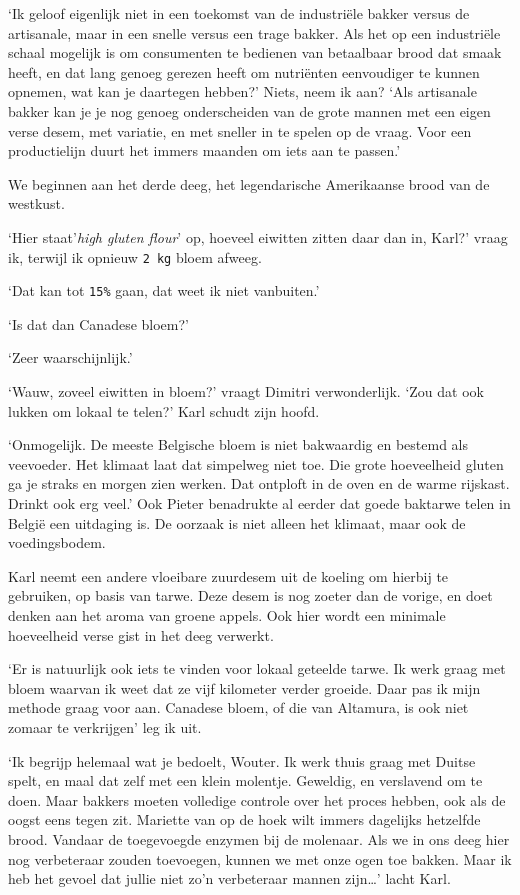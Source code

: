 \documentclass[
  11pt,
  dutch,
]{memoir}
\begin{document}
`Ik geloof eigenlijk niet in een toekomst van de industriële bakker
versus de artisanale, maar in een snelle versus een trage bakker. Als
het op een industriële schaal mogelijk is om consumenten te bedienen van
betaalbaar brood dat smaak heeft, en dat lang genoeg gerezen heeft om
nutriënten eenvoudiger te kunnen opnemen, wat kan je daartegen hebben?'
Niets, neem ik aan? `Als artisanale bakker kan je je nog genoeg
onderscheiden van de grote mannen met een eigen verse desem, met
variatie, en met sneller in te spelen op de vraag. Voor een
productielijn duurt het immers maanden om iets aan te passen.'

We beginnen aan het derde deeg, het legendarische Amerikaanse brood van
de westkust.

`Hier staat'\emph{high gluten flour}' op, hoeveel eiwitten zitten daar
dan in, Karl?' vraag ik, terwijl ik opnieuw \texttt{2\ kg} bloem afweeg.

`Dat kan tot \texttt{15\%} gaan, dat weet ik niet vanbuiten.'

`Is dat dan Canadese bloem?'

`Zeer waarschijnlijk.'

`Wauw, zoveel eiwitten in bloem?' vraagt Dimitri verwonderlijk. `Zou dat
ook lukken om lokaal te telen?' Karl schudt zijn hoofd.

`Onmogelijk. De meeste Belgische bloem is niet bakwaardig en bestemd als
veevoeder. Het klimaat laat dat simpelweg niet toe. Die grote
hoeveelheid gluten ga je straks en morgen zien werken. Dat ontploft in
de oven en de warme rijskast. Drinkt ook erg veel.' Ook Pieter
benadrukte al eerder dat goede baktarwe telen in België een uitdaging
is. De oorzaak is niet alleen het klimaat, maar ook de voedingsbodem.

Karl neemt een andere vloeibare zuurdesem uit de koeling om hierbij te
gebruiken, op basis van tarwe. Deze desem is nog zoeter dan de vorige,
en doet denken aan het aroma van groene appels. Ook hier wordt een
minimale hoeveelheid verse gist in het deeg verwerkt.

`Er is natuurlijk ook iets te vinden voor lokaal geteelde tarwe. Ik werk
graag met bloem waarvan ik weet dat ze vijf kilometer verder groeide.
Daar pas ik mijn methode graag voor aan. Canadese bloem, of die van
Altamura, is ook niet zomaar te verkrijgen' leg ik uit.

`Ik begrijp helemaal wat je bedoelt, Wouter. Ik werk thuis graag met
Duitse spelt, en maal dat zelf met een klein molentje. Geweldig, en
verslavend om te doen. Maar bakkers moeten volledige controle over het
proces hebben, ook als de oogst eens tegen zit. Mariette van op de hoek
wilt immers dagelijks hetzelfde brood. Vandaar de toegevoegde enzymen
bij de molenaar. Als we in ons deeg hier nog verbeteraar zouden
toevoegen, kunnen we met onze ogen toe bakken. Maar ik heb het gevoel
dat jullie niet zo'n verbeteraar mannen zijn\ldots{}' lacht Karl.
\end{document}
